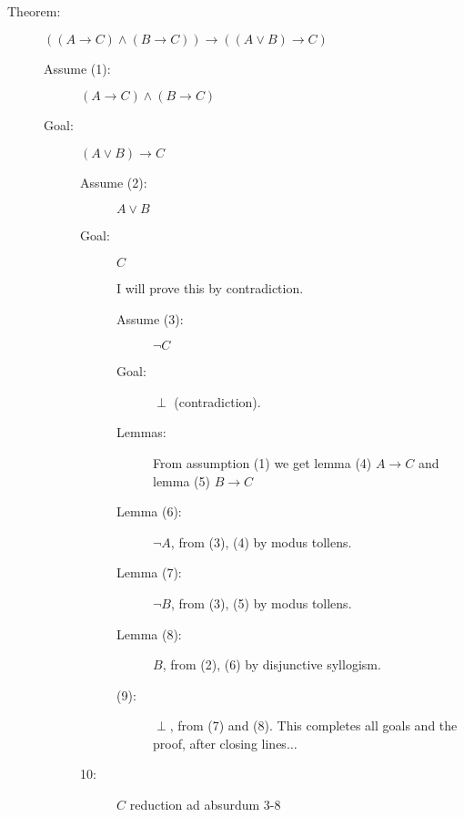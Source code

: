 \documentclass[12pt]{article}
\begin{document}
\begin{description}

\item[Theorem:]  $((A \rightarrow C) \wedge (B \rightarrow C)) \rightarrow ((A \vee B) \rightarrow C)$

\begin{description}

\item[Assume (1):] $(A \rightarrow C) \wedge (B \rightarrow C)$

\item [Goal:]  $(A \vee B) \rightarrow C$

\begin{description}

\item[Assume (2):]  $A \vee B$

\item[Goal:]  $C$

I will prove this by contradiction.

\begin{description}

\item[Assume (3):]  $\neg C$

\item[Goal:]  $\perp$ (contradiction).

\item[Lemmas:]  From assumption (1) we get lemma (4) $A \rightarrow C$
and lemma (5) $B \rightarrow C$

\item[Lemma (6):]  $\neg A$, from (3), (4) by modus tollens.

\item[Lemma (7):]  $\neg B$, from (3), (5) by modus tollens.

\item[Lemma (8):]  $B$, from (2), (6) by disjunctive syllogism.

\item[(9):] $\perp$, from (7) and (8).  This completes all
goals and the proof, after closing lines$\ldots$


\end{description}

\item[10:]  $C$ reduction ad absurdum 3-8
\end{description}

\end{description}


\end{description}
\end{document}
